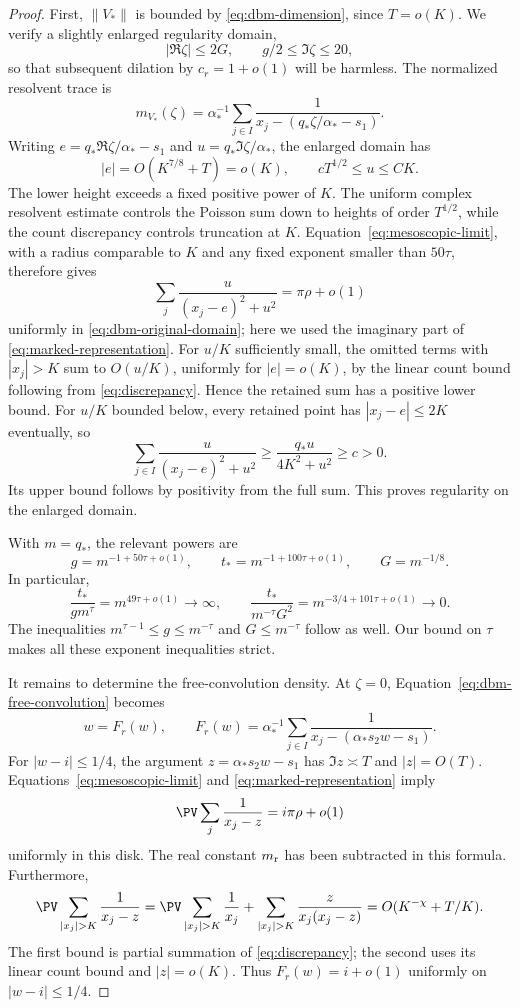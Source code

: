 \begin{proof}
First, \(\|V_*\|\) is bounded by
\eqref{eq:dbm-dimension}, since \(T=o(K)\).
We verify a slightly enlarged regularity domain,
\[
 |\Re\zeta|\le2G,\qquad g/2\le\Im\zeta\le20,
\]
so that subsequent dilation by \(c_r=1+o(1)\) will be harmless.
The normalized resolvent trace is
\[
 m_{V_*}(\zeta)=
   \alpha_*^{-1}\sum_{j\in I}
        \frac1{x_j-(q_*\zeta/\alpha_*-s_1)}.
\]
Writing \(e=q_*\Re\zeta/\alpha_*-s_1\) and
\(u=q_*\Im\zeta/\alpha_*\), the enlarged domain has
\begin{equation}
 \label{eq:dbm-original-domain}
 |e|=O(K^{7/8}+T)=o(K),\qquad
 cT^{1/2}\le u\le CK.
\end{equation}
The lower height exceeds a fixed positive power of \(K\).
The uniform complex resolvent estimate controls the Poisson sum down to
heights of order \(T^{1/2}\), while the count discrepancy controls
truncation at \(K\).
Equation~\eqref{eq:mesoscopic-limit}, with a radius comparable to \(K\)
and any fixed exponent smaller than \(50\tau\), therefore gives
\[
 \sum_j\frac{u}{(x_j-e)^2+u^2}
       =\pi\rho+o(1)
\]
uniformly in \eqref{eq:dbm-original-domain}; here we used the
imaginary part of \eqref{eq:marked-representation}.
For \(u/K\) sufficiently small, the omitted terms with \(|x_j|>K\)
sum to \(O(u/K)\), uniformly for \(|e|=o(K)\), by the linear count
bound following from \eqref{eq:discrepancy}. Hence the retained sum
has a positive lower bound. For \(u/K\) bounded below, every retained
point has \(|x_j-e|\le2K\) eventually, so
\[
 \sum_{j\in I}\frac{u}{(x_j-e)^2+u^2}
   \ge \frac{q_*u}{4K^2+u^2}\ge c>0.
\]
Its upper bound follows by positivity from the full sum.
This proves regularity on the enlarged domain.

With \(m=q_*\), the relevant powers are
\[
 g=m^{-1+50\tau+o(1)},\qquad
 t_*=m^{-1+100\tau+o(1)},\qquad G=m^{-1/8}.
\]
In particular,
\[
 \frac{t_*}{g m^\tau}=m^{49\tau+o(1)}\longrightarrow\infty,
 \qquad
 \frac{t_*}{m^{-\tau}G^2}
     =m^{-3/4+101\tau+o(1)}\longrightarrow0.
\]
The inequalities \(m^{\tau-1}\le g\le m^{-\tau}\) and
\(G\le m^{-\tau}\) follow as well. Our bound on \(\tau\) makes all
these exponent inequalities strict.

It remains to determine the free-convolution density. At \(\zeta=0\),
Equation~\eqref{eq:dbm-free-convolution} becomes
\begin{equation}
 \label{eq:dbm-boundary-equation}
 w=F_r(w),\qquad
 F_r(w)=\alpha_*^{-1}\sum_{j\in I}
     \frac1{x_j-(\alpha_*s_2w-s_1)}.
\end{equation}
For \(|w-i|\le1/4\), the argument
\(z=\alpha_*s_2w-s_1\) has \(\Im z\asymp T\) and \(|z|=O(T)\).
Equations~\eqref{eq:mesoscopic-limit} and
\eqref{eq:marked-representation} imply
\[
 \PV\sum_j\frac1{x_j-z}=i\pi\rho+o(1)
\]
uniformly in this disk. The real constant \(m_{\rm r}\) has been
subtracted in this formula. Furthermore,
\[
 \PV\sum_{|x_j|>K}\frac1{x_j-z}
   =\PV\sum_{|x_j|>K}\frac1{x_j}
      +\sum_{|x_j|>K}\frac{z}{x_j(x_j-z)}
   =O(K^{-\chi}+T/K).
\]
The first bound is partial summation of
\eqref{eq:discrepancy}; the second uses its linear count bound and
\(|z|=o(K)\). Thus \(F_r(w)=i+o(1)\) uniformly on
\(|w-i|\le1/4\).


\end{proof}
